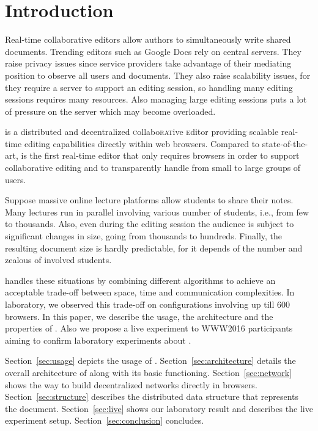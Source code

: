 
\section{Introduction}
\label{sec:introduction}

Real-time collaborative editors allow authors to simultaneously write shared
documents. Trending editors such as Google Docs rely on
central servers. They raise privacy issues since service providers take
advantage of their mediating position to observe all users and documents. They
also raise scalability issues, for they require a server to support an editing
session, so handling many editing sessions requires many resources. Also
managing large editing sessions puts a lot of pressure on the server which may
become overloaded.


\CRATE is a distributed and decentralized \textsc{c}ollabo\textsc{rat}ive
\textsc{e}ditor providing scalable real-time editing capabilities directly
within web browsers. Compared to state-of-the-art, \CRATE is the first real-time
editor that only requires browsers in order to support collaborative editing and
to transparently handle from small to large groups of users.

Suppose massive online lecture platforms allow students to share their
notes. Many lectures run in parallel involving various number of students, i.e.,
from few to thousands. Also, even during the editing session the audience is subject
to significant changes in size, going from thousands to hundreds. Finally, the
resulting document size is hardly predictable, for it depends of the number and
zealous of involved students.

\CRATE handles these situations by combining different algorithms to achieve an
acceptable trade-off between space, time and communication complexities. In
laboratory, we observed this trade-off on configurations involving up till 600
browsers. In this paper, we describe the usage, the architecture and the
properties of \CRATE. Also we propose a live experiment to WWW2016 participants
aiming to confirm laboratory experiments about \CRATE.

Section~\ref{sec:usage} depicts the usage of \CRATE.
Section~\ref{sec:architecture} details the overall architecture of \CRATE along
with its basic functioning. Section~\ref{sec:network} shows the way to build
decentralized networks directly in browsers.  Section~\ref{sec:structure}
describes the distributed data structure that represents the document.
Section~\ref{sec:live} shows our laboratory result and describes the live
experiment setup. Section~\ref{sec:conclusion} concludes.


